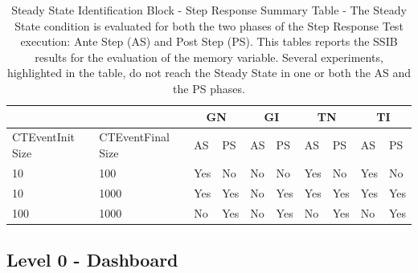 \begin{table}[h]
\centering
\scriptsize
\begin{tabular}{ll|l|l|l|l|l|l|l|l|}
\cline{3-10}
                                       &                   & \multicolumn{2}{c|}{GN}                                 & \multicolumn{2}{c|}{GI}                                 & \multicolumn{2}{c|}{TN}                                 & \multicolumn{2}{c|}{TI}                                  \\ \hline
\multicolumn{1}{|l|}{CTEventInit Size} & CTEventFinal Size & AS                         & PS                         & AS                         & PS                         & AS                         & PS                         & AS                          & PS                         \\ \hline
\multicolumn{1}{|l|}{10}               & 100               & Yes                        & \cellcolor[HTML]{C0C0C0}No & \cellcolor[HTML]{C0C0C0}No & \cellcolor[HTML]{C0C0C0}No & Yes                        & \cellcolor[HTML]{C0C0C0}No & \cellcolor[HTML]{FFFFFF}Yes & \cellcolor[HTML]{C0C0C0}No \\ \hline
\multicolumn{1}{|l|}{10}               & 1000              & Yes                        & Yes                        & \cellcolor[HTML]{C0C0C0}No & Yes                        & Yes                        & Yes                        & Yes                         & Yes                        \\ \hline
\multicolumn{1}{|l|}{100}              & 1000              & \cellcolor[HTML]{C0C0C0}No & Yes                        & \cellcolor[HTML]{C0C0C0}No & Yes                        & \cellcolor[HTML]{C0C0C0}No & Yes                        & \cellcolor[HTML]{C0C0C0}No  & Yes                        \\ \hline
\end{tabular}
\caption[Steady State Identification Block - Step Response Summary Table - Memory]{Steady State Identification Block - Step Response Summary Table - The Steady State condition is evaluated for both the two phases of the Step Response Test execution: Ante Step (AS) and Post Step (PS). This tables reports the SSIB results for the evaluation of the memory variable. Several experiments, highlighted in the table, do not reach the Steady State in one or both the AS and the PS phases.}
\label{tab:ss-step-memory}
\end{table}

\subsection{Level 0 - Dashboard}\label{sec:level0-step-dashboard}

